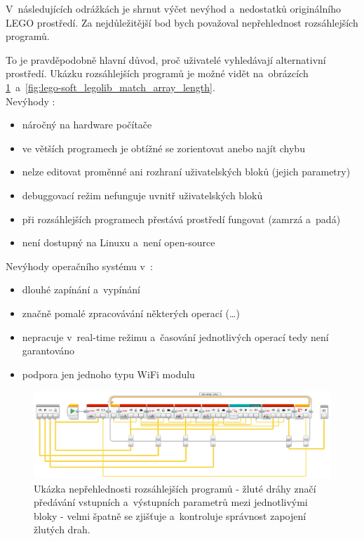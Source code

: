 V~následujících odrážkách je shrnut výčet nevýhod a~nedostatků originálního LEGO prostředí. 
Za nejdůležitější bod bych považoval nepřehlednost rozsáhlejších programů. %


To je pravděpodobně hlavní důvod, proč uživatelé \legoM{} vyhledávají alternativní prostředí. 
Ukázku rozsáhlejších programů je možné vidět na~obrázcích \ref{fig:lego-soft_legolib_converge_array}~a~\ref{fig:lego-soft_legolib_match_array_length}.\\

Nevýhody \legoSW:

\renewcommand{\labelitemi}{$-$} %
\begin{itemize}[noitemsep]\itemsep2pt
	\item náročný na hardware počítače
	\item ve větších programech je obtížné se zorientovat anebo najít chybu
	\item nelze editovat proměnné ani rozhraní uživatelských bloků (jejich parametry)
	\item debuggovací režim nefunguje uvnitř uživatelských bloků
	\item při rozsáhlejších programech přestává prostředí fungovat (zamrzá a~padá)
	\item není dostupný na Linuxu a~není open-source
\end{itemize}

Nevýhody operačního systému v~:
\begin{itemize}[noitemsep]\itemsep2pt
	\item dlouhé zapínání a~vypínání
	\item značně pomalé zpracovávání některých operací (\dots) %
	\item nepracuje v~real-time režimu a~časování jednotlivých operací tedy není garantováno
	\item podpora jen jednoho typu WiFi modulu
\end{itemize}
\renewcommand{\labelitemi}{$\bullet$} %

\begin{figure}[h]
	\centering
	\includegraphics[width=\textwidth]{images/lego-soft_legolib_converge_array.png}
	\caption[Ukázka nepřehlednosti rozsáhlejších programů]{Ukázka nepřehlednosti rozsáhlejších programů - žluté dráhy značí předávání vstupních a~výstupních parametrů mezi jednotlivými bloky - velmi špatně se zjišťuje a~kontroluje správnost zapojení žlutých drah.}
	\label{fig:lego-soft_legolib_converge_array}
\end{figure}
 
